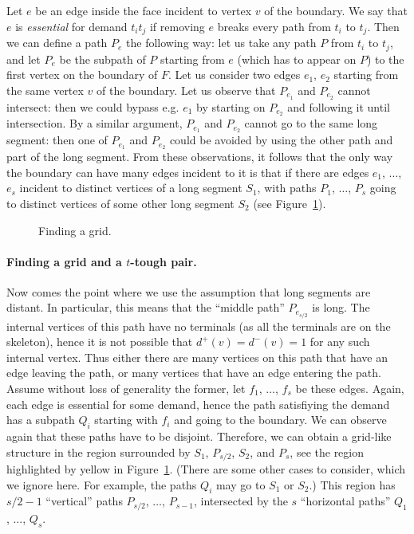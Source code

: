 Let $e$ be an edge inside the face incident to vertex $v$ of the boundary. We say that $e$ is \emph{essential} for demand $t_it_j$ if removing $e$ breaks every path from $t_i$ to $t_j$. Then we can define a path $P_e$ the following way: let us take any path $P$ from $t_i$ to $t_j$, and let $P_e$ be the subpath of $P$ starting from $e$ (which has to appear on $P$) to the first vertex on the boundary of $F$. Let us consider two edges $e_1$, $e_2$ starting from the same vertex $v$ of the boundary. Let us observe that $P_{e_1}$ and $P_{e_2}$ cannot intersect: then we could bypass e.g. $e_1$ by starting on $P_{e_2}$ and following it until intersection. By a similar argument, $P_{e_1}$ and $P_{e_2}$ cannot go to the same long segment: then one of $P_{e_1}$ and $P_{e_2}$ could be avoided by using the other path and part of the long segment. From these observations, it follows that the only way the boundary can have many edges incident to it is that if there are edges $e_1$, $\dots$, $e_s$ incident to distinct vertices of a long segment $S_1$, with paths $P_{1}$, $\dots$, $P_{s}$ going to distinct vertices of some other long segment $S_2$ (see Figure~\ref{fig:gridintro}).

\begin{figure}
  \begin{center}
    { \small {}}
  \end{center}
  \caption{Finding a grid.}\label{fig:gridintro}
\end{figure}


\paragraph{Finding a grid and a $t$-tough pair.} Now comes the point where we use the assumption that long segments are distant. In particular, this means that the ``middle path'' $P_{e_{s/2}}$ is long. The internal vertices of this path have no terminals (as all the terminals are on the skeleton), hence it is not possible that $d^+(v)=d^-(v)=1$ for any such internal vertex. Thus either there are many vertices on this path that have an edge leaving the path, or many vertices that have an edge entering the path. Assume without loss of generality the former, let $f_1$, $\dots$, $f_{s}$ be these edges. Again, each edge is essential for some demand, hence the path satisfiying the demand has a subpath $Q_{i}$ starting with $f_i$ and going to the boundary. We can observe again that these paths have to be disjoint. Therefore, we can obtain a grid-like structure in the region surrounded by $S_1$, $P_{s/2}$, $S_2$, and $P_s$, see the region highlighted by yellow in Figure~\ref{fig:gridintro}. (There are some other cases to consider, which we ignore here. For example, the paths $Q_i$ may go to $S_1$ or $S_2$.) This region has $s/2-1$ ``vertical'' paths $P_{s/2}$, $\dots$, $P_{s-1}$, intersected by the $s$ ``horizontal paths'' $Q_{1}$, $\dots$, $Q_s$.


